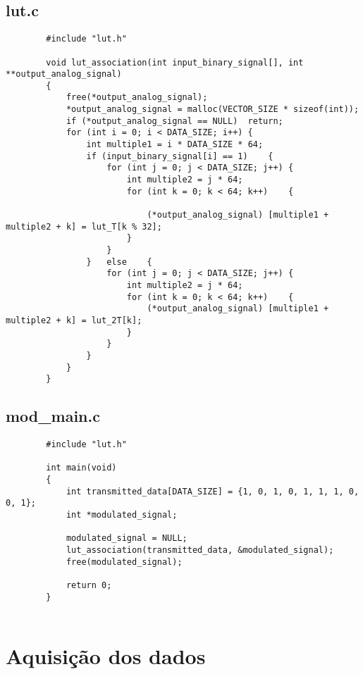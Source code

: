 \documentclass[11pt,a4paper]{report}
\begin{document}
	\subsection{lut.c}
		\begin{verbatim}
		#include "lut.h"
		
		void lut_association(int input_binary_signal[], int **output_analog_signal)
		{
			free(*output_analog_signal);
			*output_analog_signal = malloc(VECTOR_SIZE * sizeof(int));
			if (*output_analog_signal == NULL)	return;
			for (int i = 0; i < DATA_SIZE; i++)	{
				int multiple1 = i * DATA_SIZE * 64;
				if (input_binary_signal[i] == 1)	{
					for (int j = 0; j < DATA_SIZE; j++)	{
						int multiple2 = j * 64;
						for (int k = 0; k < 64; k++)	{
							
							(*output_analog_signal) [multiple1 + multiple2 + k] = lut_T[k % 32];
						}
					}
				}	else	{
					for (int j = 0; j < DATA_SIZE; j++)	{
						int multiple2 = j * 64;
						for (int k = 0; k < 64; k++)	{
							(*output_analog_signal) [multiple1 + multiple2 + k] = lut_2T[k];
						}
					}
				}
			}
		}
		\end{verbatim}
		
	\subsection{mod\_main.c}
		\begin{verbatim}
		#include "lut.h"
		
		int main(void)
		{
			int transmitted_data[DATA_SIZE] = {1, 0, 1, 0, 1, 1, 1, 0, 0, 1};
			int *modulated_signal;
		
			modulated_signal = NULL;
			lut_association(transmitted_data, &modulated_signal);
			free(modulated_signal);
		
			return 0;
		}
		
		\end{verbatim}
		
	\section{Aquisição dos dados}
	
\end{document}
